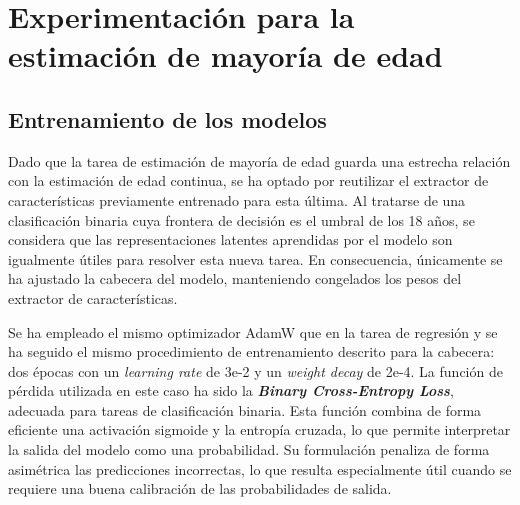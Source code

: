 




\section{Experimentación para la estimación de mayoría de edad}


\subsection{Entrenamiento de los modelos}

Dado que la tarea de estimación de mayoría de edad guarda una estrecha relación con la estimación de edad continua, se ha optado por reutilizar el extractor de características previamente entrenado para esta última. Al tratarse de una clasificación binaria cuya frontera de decisión es el umbral de los 18 años, se considera que las representaciones latentes aprendidas por el modelo son igualmente útiles para resolver esta nueva tarea. En consecuencia, únicamente se ha ajustado la cabecera del modelo, manteniendo congelados los pesos del extractor de características. 

Se ha empleado el mismo optimizador AdamW que en la tarea de regresión y se ha seguido el mismo procedimiento de entrenamiento descrito para la cabecera: dos épocas con un \textit{learning rate} de 3e-2 y un \textit{weight decay} de 2e-4. La función de pérdida utilizada en este caso ha sido la \textbf{\textit{Binary Cross-Entropy Loss}}, adecuada para tareas de clasificación binaria. Esta función combina de forma eficiente una activación sigmoide y la entropía cruzada, lo que permite interpretar la salida del modelo como una probabilidad. Su formulación penaliza de forma asimétrica las predicciones incorrectas, lo que resulta especialmente útil cuando se requiere una buena calibración de las probabilidades de salida.

